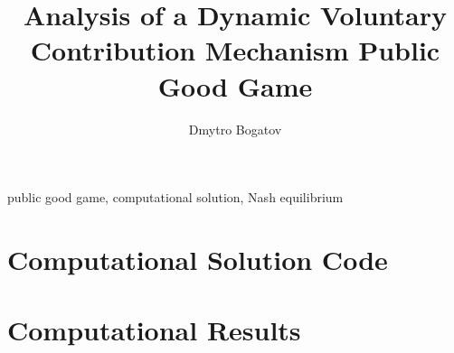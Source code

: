 \documentclass{style}		%
\begin{document}
	\begin{frontmatter}

		\title{Analysis of a Dynamic Voluntary Contribution Mechanism Public Good Game} 

		\author{Dmytro Bogatov} 

		\address{Worcester Polytechnic Institute, Worcester, MA 01609 USA \\ (e-mail: dmytro@dbogatov.org)}

		

		\begin{keyword}
			public good game, computational solution, Nash equilibrium
		\end{keyword}

	\end{frontmatter}
	

	
													
	\appendix

		\section{Computational Solution Code}
		\section{Computational Results}
	
\end{document}
